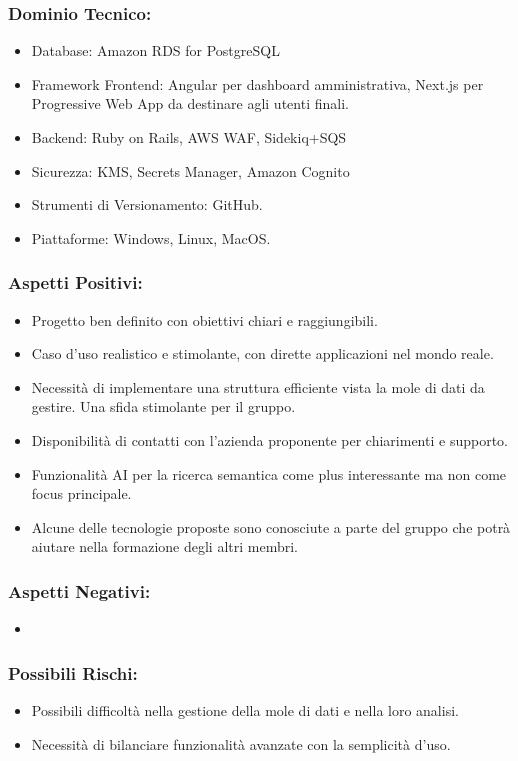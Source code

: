 \documentclass[a4paper,12pt]{article}
\begin{document}
\subsubsection*{Dominio Tecnico:}
\begin{itemize}
    \item Database: Amazon RDS for PostgreSQL
    \item Framework Frontend: Angular per dashboard amministrativa, Next.js per Progressive Web App da destinare agli utenti finali.
    \item Backend: Ruby on Rails, AWS WAF, Sidekiq+SQS
    \item Sicurezza: KMS, Secrets Manager, Amazon Cognito
    \item Strumenti di Versionamento: GitHub.
    \item Piattaforme: Windows, Linux, MacOS.
\end{itemize}
\subsubsection*{Aspetti Positivi:}
\begin{itemize}
    \item Progetto ben definito con obiettivi chiari e raggiungibili.
    \item Caso d'uso realistico e stimolante, con dirette applicazioni nel mondo reale.
    \item Necessità di implementare una struttura efficiente vista la mole di dati da gestire. Una sfida stimolante per il gruppo.
    \item Disponibilità di contatti con l'azienda proponente per chiarimenti e supporto.
    \item Funzionalità AI per la ricerca semantica come plus interessante ma non come focus principale.
    \item Alcune delle tecnologie proposte sono conosciute a parte del gruppo che potrà aiutare nella formazione degli altri membri.
\end{itemize}

\subsubsection*{Aspetti Negativi:}
\begin{itemize}
    \item 
\end{itemize}

\subsubsection*{Possibili Rischi:}
\begin{itemize}
    \item Possibili difficoltà nella gestione della mole di dati e nella loro analisi.
    \item Necessità di bilanciare funzionalità avanzate con la semplicità d'uso.
\end{itemize}
\end{document}

